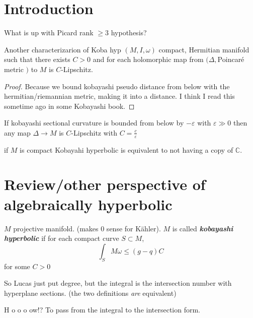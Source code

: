 \section{Introduction}


\begin{question}\leavevmode
	What is up with Picard rank $\geq  3$ hypothesis?
\end{question}

\begin{thing4}{Another characterizarion of Koba hyp}\leavevmode
	$(M,I,\omega)$ compact, Hermitian manifold such that there exists $C>0$ and for each holomorphic map from $(\Delta,$Poincaré metric $)$ to $M$ is $C$-Lipschitz.
\end{thing4}
\begin{proof}\leavevmode
Because we bound kobayashi pseudo distance from below with the hermitian/riemannian metric, making it into a distance. I think I read this sometime ago in some Kobayashi book.
\end{proof}

\begin{claim}\leavevmode
	If kobayashi sectional curvature is bounded from below by $-\varepsilon$ with $\varepsilon\gg 0$ then any map $\Delta \to M$ is $C$-Lipschitz with $C=\frac{c}{\varepsilon}$
\end{claim}

\begin{thm}[Brody]\leavevmode
if $M$ is compact Kobayahi hyperbolic is equivalent to not having a copy of $\mathbb{C}$.
\end{thm}

\section{Review/other perspective of algebraically hyperbolic}

\begin{defn}\leavevmode
	$M$ projective manifold. (makes 0 sense for Kähler). $M$ is called \textit{\textbf{kobayashi hyperbolic}} if for each compact curve  $S \subset M$, 
	\[\int_{S}M\omega\leq (g-q)C\]
	for some $C>0$
\end{defn}

\begin{remark}\leavevmode
	So Lucas just put degree, but the integral is the intersection number with hyperplane sections. (the two definitions \textit{are} equivalent)
\end{remark}

\begin{question}\leavevmode
	 H o o o ow!? To pass from the integral to the intersection form.
\end{question}

